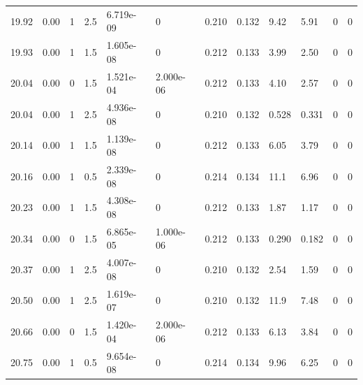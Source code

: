 \documentclass[preview]{standalone}
\begin{document}
{{{{{{{\begin{tabular}{L{1.2cm}C{1.2cm} C{0.3cm}C{0.5cm} C{1.4cm}C{1.4cm} C{1.4cm}C{1.4cm} C{1.6cm}C{1.6cm} C{1.6cm}C{1.6cm}}
  19.92  &  0.00  & 1     & 2.5 &  6.719e-09  & 0  &  0.210&   0.132& 9.42 & 5.91   &  0 & 0  \\ 
  19.93  &  0.00  & 1     & 1.5 &  1.605e-08  & 0  &  0.212&   0.133& 3.99 & 2.50   &  0 & 0  \\ 
  20.04  &  0.00  & 0     & 1.5 &  1.521e-04  & 2.000e-06  &  0.212&   0.133& 4.10 & 2.57   &  0 & 0  \\ 
  20.04  &  0.00  & 1     & 2.5 &  4.936e-08  & 0  &  0.210&   0.132& 0.528 & 0.331   &  0 & 0  \\ 
  20.14  &  0.00  & 1     & 1.5 &  1.139e-08  & 0  &  0.212&   0.133& 6.05 & 3.79   &  0 & 0  \\ 
  20.16  &  0.00  & 1     & 0.5 &  2.339e-08  & 0  &  0.214&   0.134& 11.1 & 6.96   &  0 & 0  \\ 
  20.23  &  0.00  & 1     & 1.5 &  4.308e-08  & 0  &  0.212&   0.133& 1.87 & 1.17   &  0 & 0  \\ 
  20.34  &  0.00  & 0     & 1.5 &  6.865e-05  & 1.000e-06  &  0.212&   0.133& 0.290 & 0.182   &  0 & 0  \\ 
  20.37  &  0.00  & 1     & 2.5 &  4.007e-08  & 0  &  0.210&   0.132& 2.54 & 1.59   &  0 & 0  \\ 
  20.50  &  0.00  & 1     & 2.5 &  1.619e-07  & 0  &  0.210&   0.132& 11.9 & 7.48   &  0 & 0  \\ 
  20.66  &  0.00  & 0     & 1.5 &  1.420e-04  & 2.000e-06  &  0.212&   0.133& 6.13 & 3.84   &  0 & 0  \\ 
  20.75  &  0.00  & 1     & 0.5 &  9.654e-08  & 0  &  0.214&   0.134& 9.96 & 6.25   &  0 & 0  \\ 
\hline 
\end{tabular} 

}}}}}}}
\end{document}
